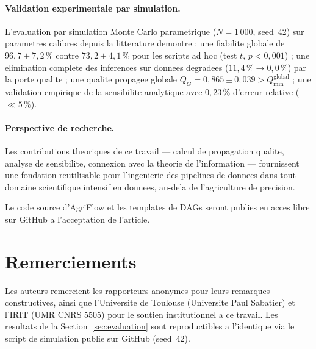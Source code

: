 \documentclass[12pt,a4paper]{article}
\theoremstyle{plain}
\theoremstyle{definition}
\theoremstyle{remark}
\begin{document}
	\paragraph{Validation experimentale par simulation.}
	L'evaluation par simulation Monte Carlo paramet\-rique ($N=1\,000$,
	seed~42) sur parametres calibres depuis la litterature demontre :
	une fiabilite globale de $96{,}7 \pm 7{,}2\,\%$ contre $73{,}2 \pm 4{,}1\,\%$
	pour les scripts ad hoc (test $t$, $p<0{,}001$) ;
	une elimination complete des inferences sur donnees degradees
	($11{,}4\,\% \to 0{,}0\,\%$) par la porte qualite ;
	une qualite propagee globale $Q_G = 0{,}865 \pm 0{,}039 > Q_{\min}^{\text{global}}$ ;
	une validation empirique de la sensibilite analytique avec
	$0{,}23\,\%$ d'erreur relative ($\ll 5\,\%$).
	
	\paragraph{Perspective de recherche.}
	Les contributions theoriques de ce travail --- calcul de propagation
	qualite, analyse de sensibilite, connexion avec la theorie de
	l'information --- fournissent une fondation reutilisable pour
	l'ingenierie des pipelines de donnees dans tout domaine scientifique
	intensif en donnees, au-dela de l'agriculture de precision.
	
	Le code source d'AgriFlow et les templates de DAGs seront publies
	en acces libre sur GitHub a l'acceptation de l'article.
	
	\section*{Remerciements}
	
	Les auteurs remercient les rapporteurs anonymes pour leurs remarques
	constructives, ainsi que
	l'Universite de Toulouse (Universite Paul Sabatier) et l'IRIT
	(UMR CNRS 5505) pour le soutien institutionnel a ce travail.
	Les resultats de la Section~\ref{sec:evaluation} sont reproductibles
	a l'identique via le script de simulation publie sur GitHub (seed~42).
	
\end{document}

